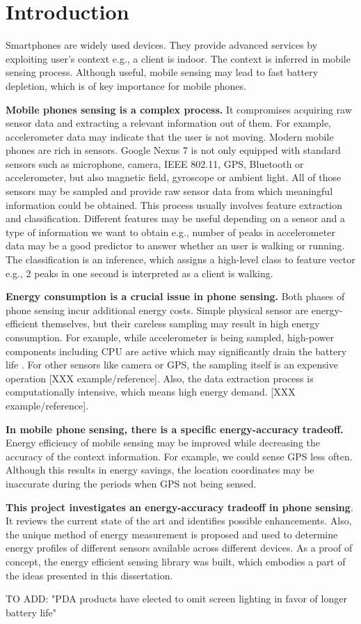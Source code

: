 \section{Introduction}
\label{s:intro}
\hspace{10pt} Smartphones are widely used devices. They provide advanced services by exploiting user's context e.g., a client is indoor. The context is inferred in mobile sensing process. Although useful, mobile sensing may lead to fast battery depletion, which is of key importance for mobile phones. 

\textbf{Mobile phones sensing is a complex process.} It compromises acquiring raw sensor data and extracting a relevant information out of them. For example, accelerometer data may indicate that the user is not moving. Modern mobile phones are rich in sensors. Google Nexus 7 is not only equipped with standard sensors such as microphone, camera, IEEE 802.11, GPS, Bluetooth or accelerometer, but also magnetic field, gyroscope or ambient light. All of those sensors may be sampled and provide raw sensor data from which meaningful information could be obtained. This process usually involves feature extraction and classification. Different features may be useful depending on a sensor and a type of information we want to obtain e.g., number of peaks in accelerometer data may be a good predictor to answer whether an user is walking or running. The classification is an inference, which assigns a high-level class to feature vector e.g., 2 peaks in one second is interpreted as a client is walking.

\textbf{Energy consumption is a crucial issue in phone sensing.} Both phases of phone sensing incur additional energy costs. Simple physical sensor are energy-efficient themselves, but their careless sampling may result in high energy consumption. For example, while accelerometer is being sampled, high-power components including CPU are active which may significantly drain the battery life \cite{priyantha:littlerock}. For other sensors like camera or GPS, the sampling itself is an expensive operation [XXX example/reference]. Also, the data extraction process is computationally intensive, which means high energy demand. [XXX example/reference]. 

\textbf{In mobile phone sensing, there is a specific energy-accuracy tradeoff.} Energy efficiency of mobile sensing may be improved while decreasing the accuracy of the context information. For example, we could sense GPS less often. Although this results in energy savings, the location coordinates may be inaccurate during the periods when GPS not being sensed. 

\textbf{This project investigates an energy-accuracy tradeoff in phone sensing}. It reviews the current state of the art and identifies possible enhancements. Also, the unique method of energy measurement is proposed and used to determine energy profiles of different sensors available across different devices. As a proof of concept, the energy efficient sensing library was built, which embodies a part of the ideas presented in this dissertation.


TO ADD: "PDA products have elected to omit screen lighting in favor of longer battery life"\\